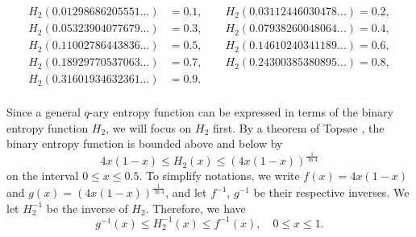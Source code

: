 \documentclass{article}
\begin{document}
\begin{equation}\label{H2-table1}
	\begin{aligned}
	H_{2}(0.01298686205551...)&=0.1,\qquad 
	H_{2}(0.03112446030478...) =0.2,\\
	H_{2}(0.05323904077679...)&=0.3,\qquad
	H_{2}(0.07938260048064...)=0.4,\\
	H_{2}(0.11002786443836...)&=0.5,\qquad
	H_{2}( 0.14610240341189...)=0.6,\\
	H_{2}(0.18929770537063...)&=0.7,\qquad
	H_{2}(0.24300385380895...)=0.8,\\
	H_{2}(0.31601934632361...)&=0.9.\\
	\end{aligned}
\end{equation}

Since a general $q$-ary entropy function can be expressed in terms of the binary entropy function $H_{2}$, we will focus on $H_{2}$ first.  By a theorem of Tops{\o}e \cite{flemming_bounds_2001}, the binary entropy function is bounded above and below by 
\[
4x(1-x)\leq H_{2}(x) \leq (4x(1-x))^{\frac{1}{\ln 4}}
\]
on the interval $0\leq x\leq 0.5$. To simplify notations, we write $f(x)=4x(1-x)$ and $g(x)=(4x(1-x))^{\frac{1}{\ln 4}}$, and let $f^{-1}$, $g^{-1}$ be their respective inverses. We let $H_{2}^{-1}$ be the inverse of $H_{2}$. Therefore, we have
\[
g^{-1}(x)\leq H_{2}^{-1}(x)\leq f^{-1}(x), \quad 0\leq x\leq 1. 
\]
\end{document}
